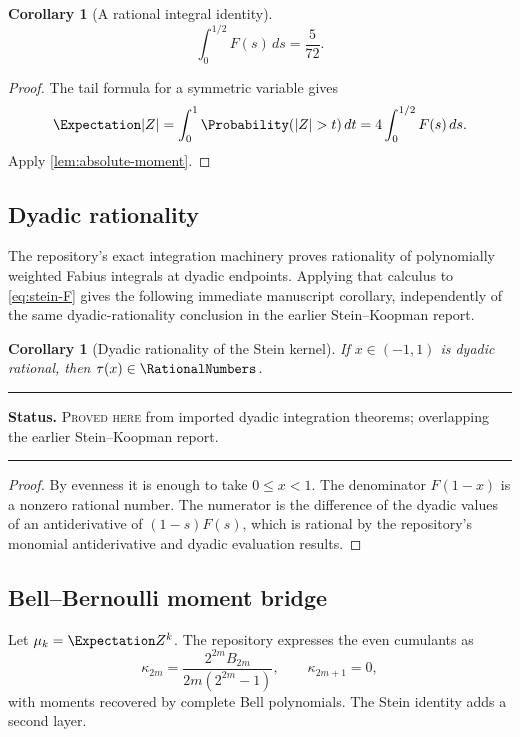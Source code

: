 \documentclass[11pt,oneside]{article}
\newtheorem{corollary}[theorem]{Corollary}
\theoremstyle{definition}
\theoremstyle{remark}
\newenvironment{boxedremark}{%
  \par\smallskip\noindent\begin{center}\begin{minipage}{0.94\textwidth}%
  \color{black}\hrule\vspace{0.6em}\small
}{%
  \vspace{0.6em}\hrule\end{minipage}\end{center}\smallskip
}
\newcommand{\ProvedHere}{\textsc{Proved here}}
\newcommand{\Status}[1]{%
  \begin{boxedremark}\textbf{Status.} #1.\end{boxedremark}}
\begin{document}
\begin{corollary}[A rational integral identity]
\begin{equation}
 \int_0^{1/2}F(s)\,ds=\frac5{72}.
\end{equation}
\end{corollary}

\begin{proof}
The tail formula for a symmetric variable gives
\[
 \Expectation|Z|=\int_0^1\Probability(|Z|>t)\,dt
 =4\int_0^{1/2}F(s)\,ds.
\]
Apply \cref{lem:absolute-moment}.
\end{proof}

\subsection{Dyadic rationality}
The repository's exact integration machinery proves rationality of polynomially
weighted Fabius integrals at dyadic endpoints.  Applying that calculus to
\eqref{eq:stein-F} gives the following immediate manuscript corollary, independently
of the same dyadic-rationality conclusion in the earlier Stein--Koopman report.

\begin{corollary}[Dyadic rationality of the Stein kernel]\label{cor:tau-dyadic}
If $x\in(-1,1)$ is dyadic rational, then $\tau(x)\in\RationalNumbers$.
\end{corollary}
\Status{\ProvedHere{} from imported dyadic integration theorems; overlapping the
earlier Stein--Koopman report}

\begin{proof}
By evenness it is enough to take $0\le x<1$.  The denominator $F(1-x)$ is a
nonzero rational number.  The numerator is the difference of the dyadic values of
an antiderivative of $(1-s)F(s)$, which is rational by the repository's monomial
antiderivative and dyadic evaluation results.
\end{proof}

\subsection{Bell--Bernoulli moment bridge}
Let $\mu_k=\Expectation Z^k$.  The repository expresses the even cumulants as
\begin{equation}\label{eq:cumulants}
 \kappa_{2m}=\frac{2^{2m}B_{2m}}{2m(2^{2m}-1)},
 \qquad \kappa_{2m+1}=0,
\end{equation}
with moments recovered by complete Bell polynomials.  The Stein identity adds a
second layer.
\end{document}
